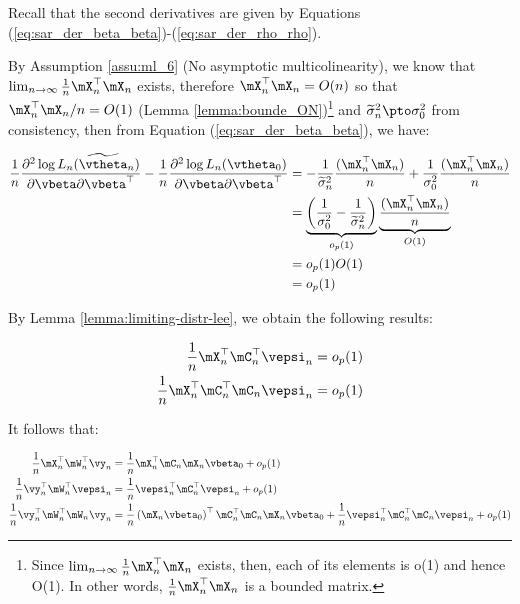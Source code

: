 \begin{subappendices}
\begin{enumerate}
   Recall that the second derivatives are given by Equations (\ref{eq:sar_der_beta_beta})-(\ref{eq:sar_der_rho_rho}).
   
   By Assumption \ref{assu:ml_6} (No asymptotic multicolinearity), we know that  $\lim_{n\to\infty}\frac{1}{n}\mX_n^\top\mX_n$ exists, therefore $\mX_n^\top\mX_n = O(n)$ so that $\mX_n^\top\mX_n/n = O(1)$ (Lemma \ref{lemma:bounde_ON})\footnote{Since $\lim_{n\to\infty}\frac{1}{n}\mX_n^\top\mX_n$ exists, then, each of its elements is o(1) and hence O(1). In other words, $\frac{1}{n}\mX_n^\top\mX_n$ is a bounded matrix.}   and $\widetilde{\sigma}^2_n\pto \sigma_0^2$ from consistency, then from Equation (\ref{eq:sar_der_beta_beta}), we have:
   
   \begin{equation*}
    \begin{aligned}
    \frac{1}{n}\frac{\partial^2 \log L_n(\widetilde{\vtheta}_n)}{\partial \vbeta \partial \vbeta^\top} - \frac{1}{n}\frac{\partial^2 \log L_n(\vtheta_0)}{\partial \vbeta \partial \vbeta^\top} & = - \frac{1}{\widetilde{\sigma}^2_n}\frac{(\mX^\top_n \mX_n)}{n} + \frac{1}{\sigma^2_0}\frac{(\mX^\top_n \mX_n)}{n} \\
    & = \underbrace{\left(\frac{1}{\sigma^2_0} - \frac{1}{\widetilde{\sigma}^2_n}\right)}_{o_p(1)}\underbrace{\frac{(\mX^\top_n \mX_n)}{n}}_{O(1)} \\
    & = o_p(1)O(1)  \\
    & = o_p(1)
    \end{aligned}
   \end{equation*}
   
  By Lemma \ref{lemma:limiting-distr-lee}, we obtain the following results:
   
   \begin{equation*}
    \begin{aligned}
      \frac{1}{n}\mX_n^\top\mC_n^\top\vepsi_n & =o_p(1) \\
      \frac{1}{n}\mX_n^\top\mC_n^\top\mC_n\vepsi_n & = o_p(1)
    \end{aligned}
   \end{equation*}
   
   It follows that:
   
   \begin{equation*}
    \begin{aligned}
      \frac{1}{n}\mX_n^\top\mW_n^\top\vy_n & = \frac{1}{n}\mX_n^\top\mC_n\mX_n\vbeta_0 + o_p(1) \\
      \frac{1}{n}\vy_n^{\top}\mW_n^{\top}\vepsi_n &= \frac{1}{n}\vepsi_n^\top\mC_n^{\top}\vepsi_n + o_p(1) \\
      \frac{1}{n}\vy_n^\top\mW_n^\top\mW_n\vy_n & = \frac{1}{n}\left(\mX_n\vbeta_0\right)^\top\mC_n^\top\mC_n\mX_n\vbeta_0 + \frac{1}{n}\vepsi_n^\top\mC_n^\top\mC_n\vepsi_n + o_p(1)
    \end{aligned}
   \end{equation*}
   

\end{enumerate}
\end{subappendices}

